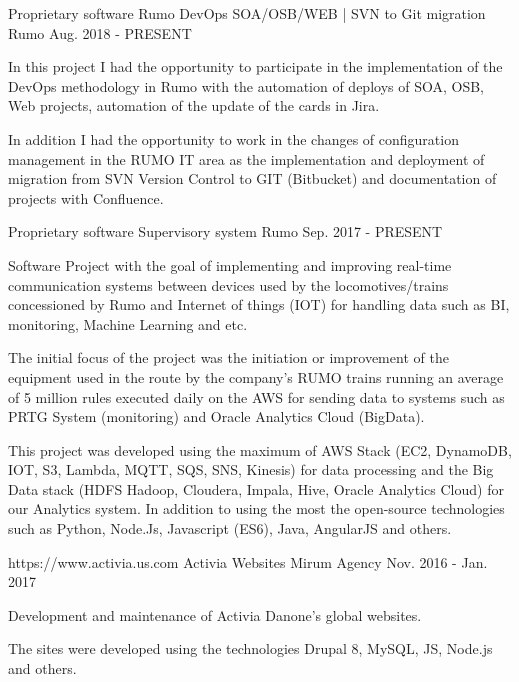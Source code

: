 \begin{cventries}
  \cventry
    {Proprietary software} %
    {Rumo DevOps SOA/OSB/WEB | SVN to Git migration }%
    {Rumo} %
    {Aug. 2018 - PRESENT} %
    {
      \begin{cvitems} %
       \item{In this project I had the opportunity to participate in the implementation of the DevOps methodology in Rumo with the automation of deploys of SOA, OSB, Web projects, automation of the update of the cards in Jira.}
       \item{In addition I had the opportunity to work in the changes of configuration management in the RUMO IT area as the implementation and deployment of migration from SVN Version Control to GIT (Bitbucket) and documentation of projects with Confluence.}
      \end{cvitems}
    }
  \cventry
    {Proprietary software} %
    {Supervisory system}%
    {Rumo} %
    {Sep. 2017 - PRESENT} %
    {
      \begin{cvitems} %
       \item{Software Project with the goal of implementing and improving real-time communication systems between devices used by the locomotives/trains concessioned by Rumo and Internet of things (IOT) for handling data such as BI, monitoring, Machine Learning and etc.}
       \item{The initial focus of the project was the initiation or improvement of the equipment used in the route by the company's RUMO trains running an average of 5 million rules executed daily on the AWS for sending data to systems such as PRTG System (monitoring) and Oracle Analytics Cloud (BigData).}
       \item{This project was developed using the maximum of AWS Stack (EC2, DynamoDB, IOT, S3, Lambda, MQTT, SQS, SNS, Kinesis) for data processing and the Big Data stack (HDFS Hadoop, Cloudera, Impala, Hive, Oracle Analytics Cloud) for our Analytics system. In addition to using the most the open-source technologies such as Python, Node.Js, Javascript (ES6), Java, AngularJS and others.}
      \end{cvitems}
    }

  \cventry
    {https://www.activia.us.com} %
    {Activia Websites} %
    {Mirum Agency} %
    {Nov. 2016 - Jan. 2017} %
    {
      \begin{cvitems} %
        \item {Development and maintenance of Activia Danone's global websites.}
        \item {The sites were developed using the technologies Drupal 8, MySQL, JS, Node.js and others.}
      \end{cvitems}
    }


\end{cventries}

